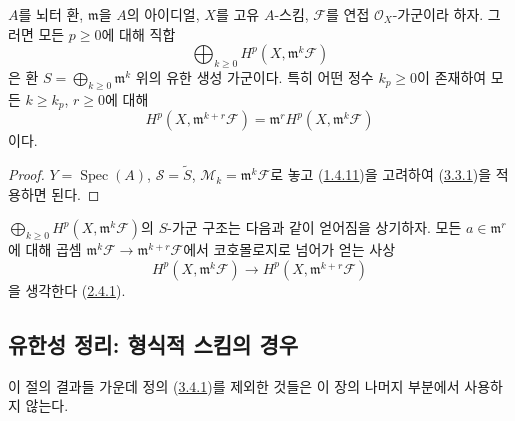 \begin{corollary}[3.3.2]
\label{III.3.3.2-fr}
$A$를 뇌터 환, $\mathfrak m$을 $A$의 아이디얼, $X$를 고유
$A$-스킴, $\mathcal F$를 연접 $\mathcal O_X$-가군이라 하자. 그러면
모든 $p\geq0$에 대해 직합
\[
\bigoplus_{k\geq0}H^p(X,\mathfrak m^k\mathcal F)
\]
은 환 $S=\bigoplus_{k\geq0}\mathfrak m^k$ 위의 유한 생성 가군이다.
특히 어떤 정수 $k_p\geq0$이 존재하여 모든 $k\geq k_p$, $r\geq0$에
대해
\[
H^p(X,\mathfrak m^{k+r}\mathcal F)
=\mathfrak m^rH^p(X,\mathfrak m^k\mathcal F)
\tag{3.3.2.1}\label{III.3.3.2.1-fr}
\]
이다.
\end{corollary}

\begin{proof}
$Y=\operatorname{Spec}(A)$, $\mathcal S=\widetilde S$,
$\mathcal M_k=\mathfrak m^k\mathcal F$로 놓고
(\hyperref[III.1.4.11-fr]{1.4.11})을 고려하여
(\hyperref[III.3.3.1-fr]{3.3.1})을 적용하면 된다.
\end{proof}

$\bigoplus_{k\geq0}H^p(X,\mathfrak m^k\mathcal F)$의 $S$-가군 구조는
다음과 같이 얻어짐을 상기하자. 모든 $a\in\mathfrak m^r$에 대해
곱셈
$\mathfrak m^k\mathcal F\to\mathfrak m^{k+r}\mathcal F$에서
코호몰로지로 넘어가 얻는 사상
\[
H^p(X,\mathfrak m^k\mathcal F)
\longrightarrow H^p(X,\mathfrak m^{k+r}\mathcal F)
\]
을 생각한다 (\hyperref[III.2.4.1-fr]{2.4.1}).

\subsection{유한성 정리: 형식적 스킴의 경우}
\label{subsection:III.3.4-fr}

이 절의 결과들 가운데 정의
(\hyperref[III.3.4.1-fr]{3.4.1})를 제외한 것들은 이 장의 나머지
부분에서 사용하지 않는다.

